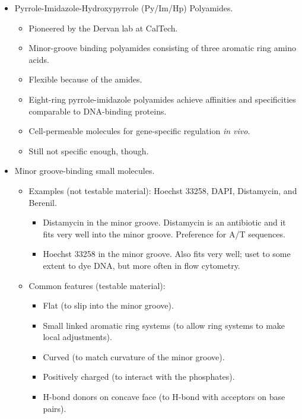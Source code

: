 \documentclass[../notes.tex]{subfiles}
\begin{document}
\begin{itemize}
\begin{itemize}
    \end{itemize}
    \item Pyrrole-Imidazole-Hydroxypyrrole (Py/Im/Hp) Polyamides.
    \begin{itemize}
        \item Pioneered by the Dervan lab at CalTech.
        \item Minor-groove binding polyamides consisting of three aromatic ring amino acids.
        \item Flexible because of the amides.
        \item Eight-ring pyrrole-imidazole polyamides achieve affinities and specificities comparable to DNA-binding proteins.
        \item Cell-permeable molecules for gene-specific regulation \emph{in vivo}.
        \item Still not specific enough, though.
    \end{itemize}
    \item Minor groove-binding small molecules.
    \begin{itemize}
        \item Examples (not testable material): Hoechst 33258, DAPI, Distamycin, and Berenil.
        \begin{itemize}
            \item Distamycin in the minor groove. Distamycin is an antibiotic and it fits very well into the minor groove. Preference for A/T sequences.
            \item Hoechst 33258 in the minor groove. Also fits very well; uset to some extent to dye DNA, but more often in flow cytometry.
        \end{itemize}
        \item Common features (testable material):
        \begin{itemize}
            \item Flat (to slip into the minor groove).
            \item Small linked aromatic ring systems (to allow ring systems to make local adjustments).
            \item Curved (to match curvature of the minor groove).
            \item Positively charged (to interact with the phosphates).
            \item H-bond donors on concave face (to H-bond with acceptors on base pairs).
        \end{itemize}
    \end{itemize}

\end{itemize}
\end{document}
